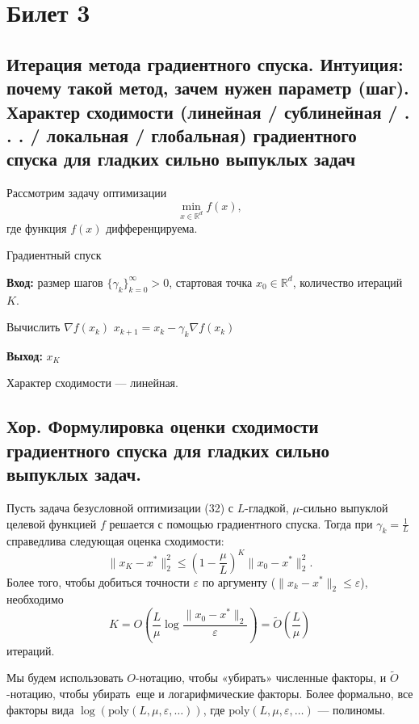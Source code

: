 \section{Билет 3}

\subsection{Итерация метода градиентного спуска. Интуиция: почему такой метод,
    зачем нужен параметр (шаг). Характер сходимости (линейная / сублинейная
    / . . . / локальная / глобальная) градиентного спуска для гладких
    сильно выпуклых задач}

Рассмотрим задачу оптимизации $$\min_{x \in \mathbb{R}^d} f(x),$$ где функция $f(x)$ дифференцируема.

\begin{algorithm}[ht]
    \caption{Градиентный спуск}
    \textbf{Вход:} размер шагов $\{\gamma_k\}_{k=0}^{\infty} > 0$, стартовая точка $x_0 \in \mathbb{R}^d$, количество итераций $K$.
    \begin{algorithmic}[1]
        \State Вычислить $\nabla f(x_k)$
        \State $x_{k+1} = x_k - \gamma_k \nabla f(x_k)$
        \EndFor
    \end{algorithmic}
    \textbf{Выход:} $x_K$
\end{algorithm}

Характер сходимости --- линейная.

\subsection{Хор. Формулировка оценки сходимости градиентного спуска для гладких сильно выпуклых задач.}

\begin{theorem}
    Пусть задача безусловной оптимизации (32) с $L$-гладкой, $\mu$-сильно выпуклой целевой функцией $f$ решается 
    с помощью градиентного спуска. Тогда при $\gamma_k = \frac{1}{L}$ справедлива следующая оценка сходимости:
    $$\|x_K - x^*\|_2^2 \leq \left( 1 - \frac{\mu}{L} \right)^K \|x_0 - x^*\|_2^2.$$
    Более того, чтобы добиться точности $\varepsilon$ по аргументу ($\|x_k - x^*\|_2 \leq \varepsilon$), необходимо
    $$K = O\left( \frac{L}{\mu} \log \frac{\|x_0 - x^*\|_2}{\varepsilon} \right) = \tilde{O}\left( \frac{L}{\mu} \right)$$
    итераций.

\end{theorem}

\begin{note}
    Мы будем использовать $O$-нотацию, чтобы «убирать» численные факторы, и $\tilde{O}$-нотацию, 
    чтобы \guillemetleft убирать\guillemetright \, еще и логарифмические факторы. Более формально, все факторы вида 
    $\log(\text{poly}(L, \mu, \varepsilon, \dots))$, где $\text{poly}(L, \mu, \varepsilon, \dots)$ --- полиномы.

\end{note}